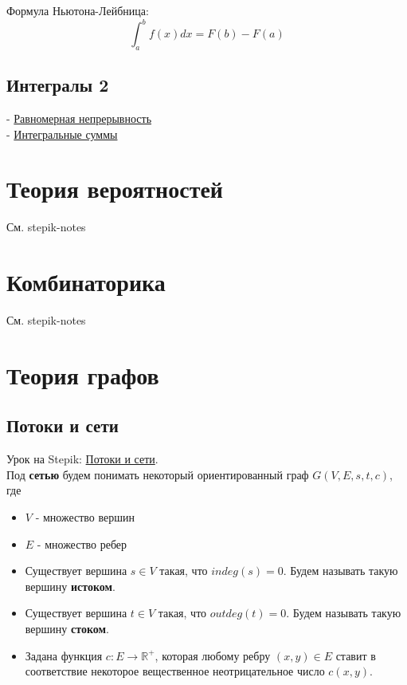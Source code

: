 \documentclass{article}
\begin{document}
Формула Ньютона-Лейбница: $$ \int_{a}^{b} f(x) dx = F(b) - F(a) $$

\subsection{Интегралы 2}

- \href{https://stepik.org/lesson/35886/step/2}{Равномерная непрерывность} \\
- \href{https://stepik.org/lesson/28384/step/1}{Интегральные суммы}

\section{Теория вероятностей}

См. stepik-notes

\section{Комбинаторика}

См. stepik-notes

\section{Теория графов}

\subsection{Потоки и сети}

Урок на Stepik: \href{https://stepik.org/lesson/36127/step/10?unit=44097}{Потоки и сети}. \\

Под \textbf{сетью} будем понимать некоторый ориентированный граф $G(V, E, s, t, c)$, где

\begin{itemize}
	\item $V$ - множество вершин
	\item $E$ - множество ребер
	\item Существует вершина $s \in V$ такая, что $indeg(s) = 0$. Будем называть такую вершину \textbf{истоком}.
	\item Существует вершина $t \in V$ такая, что $outdeg(t) = 0$. Будем называть такую вершину \textbf{стоком}.
	\item Задана функция $c: E \to \mathbb{R^+}$, которая любому ребру $(x, y) \in E$ ставит в соответствие некоторое вещественное неотрицательное число $c(x, y)$. 
\end{itemize}
\end{document}
